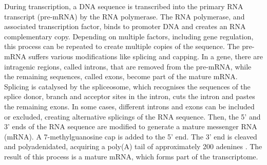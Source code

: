 During transcription, a DNA sequence is transcribed into the primary RNA transcript (pre-mRNA) by the RNA polymerase. 
The RNA polymerase, and associated transcription factor, binds to promoter DNA and creates an RNA complementary copy. 
Depending on multiple factors, including gene regulation, this process can be repeated to create multiple copies of the sequence\citep{alberts2014molecular}.
The pre-mRNA suffers various modifications like splicing and capping. 
In a gene, there are  intragenic regions, called introns, that are removed from the pre-mRNA, while the remaining sequences, called exons, become part of the mature mRNA. 
Splicing is catalysed by the spliceosome, which recognises the sequences of the splice donor, branch and acceptor sites in the intron, cuts the intron and pastes the remaining exons.
In some cases, different introns and exons can be included or excluded, creating alternative splicings of the RNA sequence\citep{alberts2014molecular}. 
Then, the 5' and 3' ends of the RNA sequence are modified to generate a mature messenger RNA (mRNA). 
A 7-methylguanosine cap is added to the 5' end. The 3' end is cleaved and polyadenidated, acquiring a poly(A) tail of approximately 200 adenines \citep{alberts2014molecular}. 
The result of this process is a mature mRNA, which forms part of the transcriptome.



